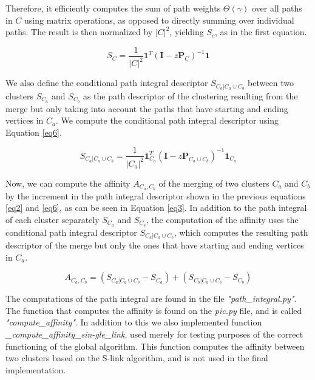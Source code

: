 \documentclass[
	10pt,
	parskip=half-,	
	paper=a4,
	english
	]{scrartcl}
\begin{document}
Therefore, it efficiently computes the sum of path weights \( \Theta(\gamma) \) over all paths in \( C \) using matrix operations, as opposed to directly summing over individual paths. The result is then normalized by \( |C|^2 \), yielding \( S_c \), as in the first equation.


\begin{equation}
    S_{C} = \frac{1}{|C|^2} \boldsymbol{1}^{T}(\boldsymbol{I}-z\boldsymbol{P}_{C})^{-1}\boldsymbol{1}
    \label{eq14}
\end{equation}

We also define the conditional path integral descriptor \(S_{C_a|C_a\cup C_b}\) between two clusters \(S_{C_a}\) and \(S_{C_b}\) as the path descriptor of the clustering resulting from the merge but only taking into account the paths that have starting and ending vertices in \(C_a\). We compute the conditional path integral descriptor using Equation \ref{eq6}.

\begin{equation}
    S_{C_a|C_a\cup C_b} = \frac{1}{|C_a|^2} \boldsymbol{1}_{C_a}^{T}(\boldsymbol{I}-z\boldsymbol{P}_{C_a\cup C_b})^{-1}\boldsymbol{1}_{C_a}
    \label{eq6}
\end{equation}

Now, we can compute the affinity \(A_{C_a,C_b}\) of the merging of two clusters \(C_a\) and \(C_b\) by the increment in the path integral descriptor shown in the previous equations \ref{eq2} and \ref{eq6}, as can be seen in Equation \ref{eq3}. In addition to the path integral of each cluster separately \(S_{C_a}\) and \(S_{C_b}\), the computation of the affinity uses the conditional path integral descriptor \(S_{C_a|C_a\cup C_b}\), which computes the resulting path descriptor of the merge but only the ones that have starting and ending vertices in \(C_a\).

\begin{equation}
    A_{C_a,C_b} = (S_{C_a|C_a\cup C_b}-S_{C_a}) + (S_{C_b|C_a\cup C_b}-S_{C_b})
    \label{eq3}
\end{equation}

The computations of the path integral are found in the file \textit{"path\_integral.py"}. The function that computes the affinity is found on the \textit{pic.py} file, and is called \textit{"compute\_affinity"}. In addition to this we also implemented function \textit{\_compute\_affinity\_sin-gle\_link}, used merely for testing purposes of the correct functioning of the global algorithm. This function computes the affinity between two clusters based on the S-link algorithm, and is not used in the final implementation.
\end{document}

